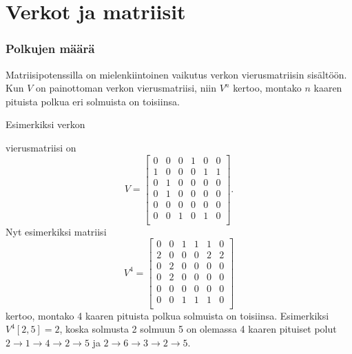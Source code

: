 \section{Verkot ja matriisit}

\subsubsection{Polkujen määrä}

Matriisipotenssilla
on mielenkiintoinen vaikutus
verkon vierusmatriisin sisältöön.
Kun $V$ on painottoman verkon vierusmatriisi,
niin $V^n$ kertoo,
montako $n$ kaaren pituista polkua
eri solmuista on toisiinsa.

Esimerkiksi verkon
\begin{center}
\end{center}
vierusmatriisi on
\[
V= \begin{bmatrix}
  0 & 0 & 0 & 1 & 0 & 0 \\
  1 & 0 & 0 & 0 & 1 & 1 \\
  0 & 1 & 0 & 0 & 0 & 0 \\
  0 & 1 & 0 & 0 & 0 & 0 \\
  0 & 0 & 0 & 0 & 0 & 0 \\
  0 & 0 & 1 & 0 & 1 & 0 \\
 \end{bmatrix}.
\]
Nyt esimerkiksi matriisi
\[
V^4= \begin{bmatrix}
  0 & 0 & 1 & 1 & 1 & 0 \\
  2 & 0 & 0 & 0 & 2 & 2 \\
  0 & 2 & 0 & 0 & 0 & 0 \\
  0 & 2 & 0 & 0 & 0 & 0 \\
  0 & 0 & 0 & 0 & 0 & 0 \\
  0 & 0 & 1 & 1 & 1 & 0 \\
 \end{bmatrix}
\]
kertoo, montako 4 kaaren pituista polkua
solmuista on toisiinsa.
Esimerkiksi $V^4[2,5]=2$,
koska solmusta 2 solmuun 5 on olemassa
4 kaaren pituiset polut
$2 \rightarrow 1 \rightarrow 4 \rightarrow 2 \rightarrow 5$
ja 
$2 \rightarrow 6 \rightarrow 3 \rightarrow 2 \rightarrow 5$.

